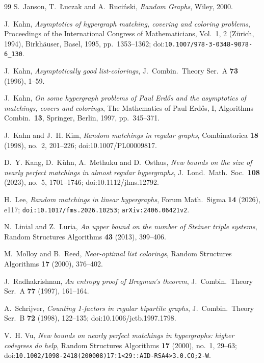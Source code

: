 \documentclass[11pt,a4paper]{amsart}
\theoremstyle{plain}
\theoremstyle{definition}
\theoremstyle{remark}
\begin{document}
\begin{thebibliography}{99}
S.~Janson, T.~{\L}uczak and A.~Ruci\'nski,
\emph{Random Graphs},
Wiley, 2000.

J.~Kahn,
\emph{Asymptotics of hypergraph matching, covering and coloring problems},
Proceedings of the International Congress of Mathematicians, Vol.\ 1, 2
(Z\"urich, 1994), Birkh\"auser, Basel, 1995, pp.\ 1353--1362;
doi:\nolinkurl{10.1007/978-3-0348-9078-6_130}.

J.~Kahn,
\emph{Asymptotically good list-colorings},
J.\ Combin.\ Theory Ser.\ A \textbf{73} (1996), 1--59.

J.~Kahn,
\emph{On some hypergraph problems of Paul Erd\H{o}s and the asymptotics of matchings,
covers and colorings},
The Mathematics of Paul Erd\H{o}s, I, Algorithms Combin.\ \textbf{13}, Springer, Berlin,
1997, pp.\ 345--371.

J.~Kahn and J.~H. Kim,
\emph{Random matchings in regular graphs},
Combinatorica \textbf{18} (1998), no.~2, 201--226;
doi:10.1007/PL00009817.

D.~Y. Kang, D.~K\"uhn, A.~Methuku and D.~Osthus,
\emph{New bounds on the size of nearly perfect matchings in almost regular hypergraphs},
J.\ Lond.\ Math.\ Soc.\ \textbf{108} (2023), no.~5, 1701--1746;
doi:10.1112/jlms.12792.

H.~Lee,
\emph{Random matchings in linear hypergraphs},
Forum Math.\ Sigma \textbf{14} (2026), e117;
\nolinkurl{doi:10.1017/fms.2026.10253}; \nolinkurl{arXiv:2406.06421v2}.

N.~Linial and Z.~Luria,
\emph{An upper bound on the number of Steiner triple systems},
Random Structures Algorithms \textbf{43} (2013), 399--406.

M.~Molloy and B.~Reed,
\emph{Near-optimal list colorings},
Random Structures Algorithms \textbf{17} (2000), 376--402.

J.~Radhakrishnan,
\emph{An entropy proof of Bregman's theorem},
J.\ Combin.\ Theory Ser.\ A \textbf{77} (1997), 161--164.

A.~Schrijver,
\emph{Counting 1-factors in regular bipartite graphs},
J.\ Combin.\ Theory Ser.\ B \textbf{72} (1998), 122--135;
doi:10.1006/jctb.1997.1798.

V.~H. Vu,
\emph{New bounds on nearly perfect matchings in hypergraphs: higher codegrees do help},
Random Structures Algorithms \textbf{17} (2000), no.~1, 29--63;
doi:\nolinkurl{10.1002/1098-2418(200008)17:1<29::AID-RSA4>3.0.CO;2-W}.

\end{thebibliography}
\end{document}
